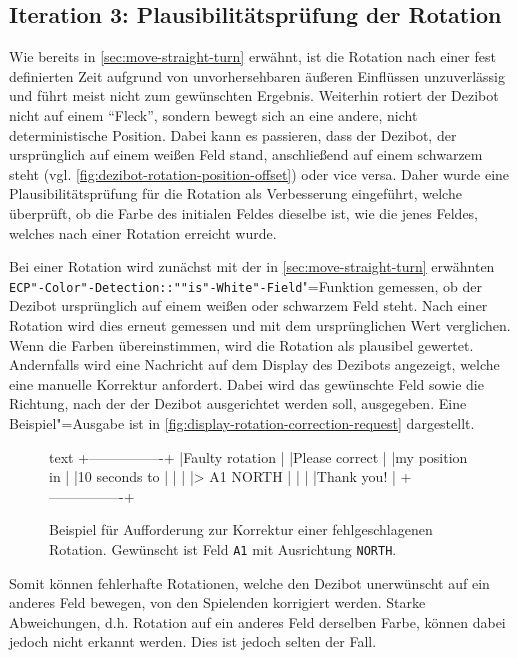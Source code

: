 \subsection{Iteration 3: Plausibilitätsprüfung der Rotation}
\label{sec:plausibility-check-rotation}

Wie bereits in \autoref{sec:move-straight-turn} erwähnt, ist die Rotation nach einer fest definierten Zeit aufgrund von unvorhersehbaren äußeren Einflüssen unzuverlässig und führt meist nicht zum gewünschten Ergebnis. Weiterhin rotiert der Dezibot nicht auf einem \enquote{Fleck}, sondern bewegt sich an eine andere, nicht deterministische Position. Dabei kann es passieren, dass der Dezibot, der ursprünglich auf einem weißen Feld stand, anschließend auf einem schwarzem steht (vgl. \autoref{fig:dezibot-rotation-position-offset}) oder vice versa. Daher wurde eine Plausibilitätsprüfung für die Rotation als Verbesserung eingeführt, welche überprüft, ob die Farbe des initialen Feldes dieselbe ist, wie die jenes Feldes, welches nach einer Rotation erreicht wurde.

Bei einer Rotation wird zunächst mit der in \autoref{sec:move-straight-turn} erwähnten \texttt{ECP"-Color"-Detection::""is"-White"-Field}"=Funktion gemessen, ob der Dezibot ursprünglich auf einem weißen oder schwarzem Feld steht. Nach einer Rotation wird dies erneut gemessen und mit dem ursprünglichen Wert verglichen. Wenn die Farben übereinstimmen, wird die Rotation als plausibel gewertet. Andernfalls wird eine Nachricht auf dem Display des Dezibots angezeigt, welche eine manuelle Korrektur anfordert. Dabei wird das gewünschte Feld sowie die Richtung, nach der der Dezibot ausgerichtet werden soll, ausgegeben. Eine Beispiel"=Ausgabe ist in \autoref{fig:display-rotation-correction-request} dargestellt.

\begin{figure}[h]
\centering
\begin{cminted}{text}
+----------------+
|Faulty rotation |
|Please correct  |
|my position in  |
|10 seconds to   |
|                |
|> A1 NORTH      |
|                |
|Thank you!      |
+----------------+
\end{cminted}
\caption{Beispiel für Aufforderung zur Korrektur einer fehlgeschlagenen Rotation. Gewünscht ist Feld \texttt{A1} mit Ausrichtung \texttt{NORTH}.}
\label{fig:display-rotation-correction-request}
\end{figure}

Somit können fehlerhafte Rotationen, welche den Dezibot unerwünscht auf ein anderes Feld bewegen, von den Spielenden korrigiert werden. Starke Abweichungen, d.h. Rotation auf ein anderes Feld derselben Farbe, können dabei jedoch nicht erkannt werden. Dies ist jedoch selten der Fall.

